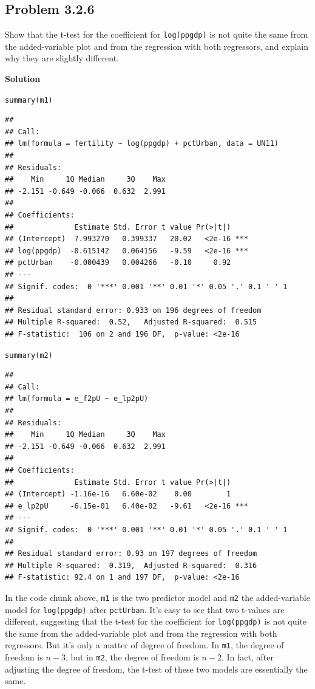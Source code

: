 \documentclass[12pt,oneside,a4paper]{article}\usepackage[]{graphicx}\usepackage[]{xcolor}
\makeatletter
\newcommand{\hlstd}[1]{\textcolor[rgb]{0,0,0}{#1}}%
\newcommand{\hlkwd}[1]{\textcolor[rgb]{0,0,0}{#1}}%
\newenvironment{kframe}{%
 \def\at@end@of@kframe{}%
 \ifinner\ifhmode%
  \def\at@end@of@kframe{\end{minipage}}%
  \begin{minipage}{\columnwidth}%
 \fi\fi%
 \def\FrameCommand##1{\hskip\@totalleftmargin \hskip-\fboxsep
 \colorbox{shadecolor}{##1}\hskip-\fboxsep
     \hskip-\linewidth \hskip-\@totalleftmargin \hskip\columnwidth}%
 \MakeFramed {\advance\hsize-\width
   \@totalleftmargin\z@ \linewidth\hsize
   \@setminipage}}%
 {\par\unskip\endMakeFramed%
 \at@end@of@kframe}
\newenvironment{knitrout}{}{} %
\newcommand{\subproblem}[1]
{
    \subsection*{Problem {#1}}
}
\newcommand{\solution}
{
    \vspace{15pt}
    \noindent\ignorespaces\textbf{\large Solution}
}
\newcommand{\m}[1]{\texttt{{#1}}}
\makeatother
\begin{document}
\subproblem{3.2.6}
Show that the t-test for the coefficient for \m{log(ppgdp)} is not quite the same from the added-variable plot and from the regression with both regressors, and explain why they are slightly different.

\solution
\begin{knitrout}
\color{fgcolor}\begin{kframe}
\begin{alltt}
\hlkwd{summary}\hlstd{(m1)}
\end{alltt}
\begin{verbatim}
## 
## Call:
## lm(formula = fertility ~ log(ppgdp) + pctUrban, data = UN11)
## 
## Residuals:
##    Min     1Q Median     3Q    Max 
## -2.151 -0.649 -0.066  0.632  2.991 
## 
## Coefficients:
##              Estimate Std. Error t value Pr(>|t|)    
## (Intercept)  7.993270   0.399337   20.02   <2e-16 ***
## log(ppgdp)  -0.615142   0.064156   -9.59   <2e-16 ***
## pctUrban    -0.000439   0.004266   -0.10     0.92    
## ---
## Signif. codes:  0 '***' 0.001 '**' 0.01 '*' 0.05 '.' 0.1 ' ' 1
## 
## Residual standard error: 0.933 on 196 degrees of freedom
## Multiple R-squared:  0.52,	Adjusted R-squared:  0.515 
## F-statistic:  106 on 2 and 196 DF,  p-value: <2e-16
\end{verbatim}
\begin{alltt}
\hlkwd{summary}\hlstd{(m2)}
\end{alltt}
\begin{verbatim}
## 
## Call:
## lm(formula = e_f2pU ~ e_lp2pU)
## 
## Residuals:
##    Min     1Q Median     3Q    Max 
## -2.151 -0.649 -0.066  0.632  2.991 
## 
## Coefficients:
##              Estimate Std. Error t value Pr(>|t|)    
## (Intercept) -1.16e-16   6.60e-02    0.00        1    
## e_lp2pU     -6.15e-01   6.40e-02   -9.61   <2e-16 ***
## ---
## Signif. codes:  0 '***' 0.001 '**' 0.01 '*' 0.05 '.' 0.1 ' ' 1
## 
## Residual standard error: 0.93 on 197 degrees of freedom
## Multiple R-squared:  0.319,	Adjusted R-squared:  0.316 
## F-statistic: 92.4 on 1 and 197 DF,  p-value: <2e-16
\end{verbatim}
\end{kframe}
\end{knitrout}

In the code chunk above, \m{m1} is the two predictor model and \m{m2} the added-variable model for \m{log(ppgdp)} after \m{pctUrban}. It's easy to see that two t-values are different, suggesting that the t-test for the coefficient for \m{log(ppgdp)} is not quite the same from the added-variable plot and from the regression with both regressors. But it's only a matter of degree of freedom. In \m{m1}, the degree of freedom is $n - 3$, but in \m{m2}, the degree of freedom is $n - 2$. In fact, after adjusting the degree of freedom, the t-test of these two models are essentially the same. 
\end{document}
